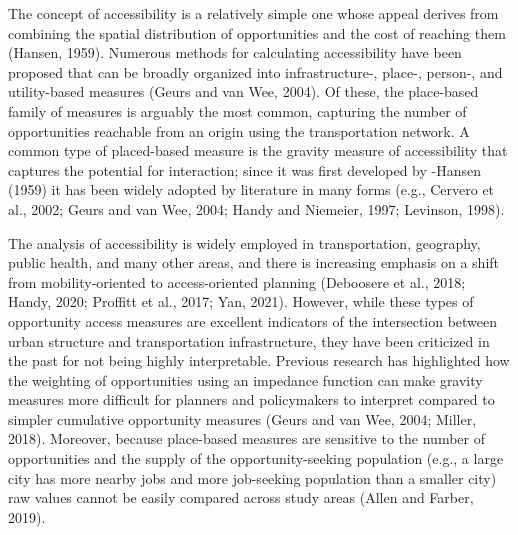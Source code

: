 \documentclass[]{elsarticle} %
\begin{document}
The concept of accessibility is a relatively simple one whose appeal
derives from combining the spatial distribution of opportunities and the
cost of reaching them (Hansen, 1959). Numerous methods for calculating
accessibility have been proposed that can be broadly organized into
infrastructure-, place-, person-, and utility-based measures (Geurs and
van Wee, 2004). Of these, the place-based family of measures is arguably
the most common, capturing the number of opportunities reachable from an
origin using the transportation network. A common type of placed-based
measure is the gravity measure of accessibility that captures the
potential for interaction; since it was first developed by -Hansen
(1959) it has been widely adopted by literature in many forms (e.g.,
Cervero et al., 2002; Geurs and van Wee, 2004; Handy and Niemeier, 1997;
Levinson, 1998).

The analysis of accessibility is widely employed in transportation,
geography, public health, and many other areas, and there is increasing
emphasis on a shift from mobility-oriented to access-oriented planning
(Deboosere et al., 2018; Handy, 2020; Proffitt et al., 2017; Yan, 2021).
However, while these types of opportunity access measures are excellent
indicators of the intersection between urban structure and
transportation infrastructure, they have been criticized in the past for
not being highly interpretable. Previous research has highlighted how
the weighting of opportunities using an impedance function can make
gravity measures more difficult for planners and policymakers to
interpret compared to simpler cumulative opportunity measures (Geurs and
van Wee, 2004; Miller, 2018). Moreover, because place-based measures are
sensitive to the number of opportunities and the supply of the
opportunity-seeking population (e.g., a large city has more nearby jobs
and more job-seeking population than a smaller city) raw values cannot
be easily compared across study areas (Allen and Farber, 2019).
\end{document}
